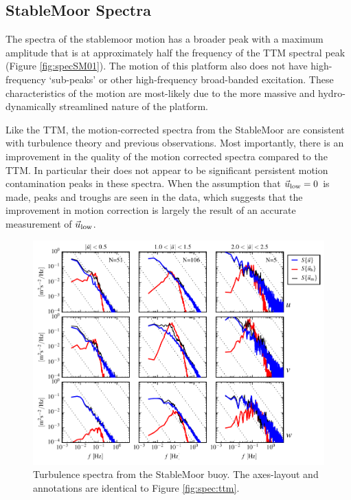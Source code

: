 \documentclass[twocol]{ametsoc}
\begin{document}
\subsection{StableMoor Spectra}

The spectra of the stablemoor motion has a broader peak with a maximum amplitude that is at approximately half the frequency of the TTM spectral peak (Figure \ref{fig:specSM01}). The motion of this platform also does not have high-frequency `sub-peaks' or other high-frequency broad-banded excitation. These characteristics of the motion are most-likely due to the more massive and hydro-dynamically streamlined nature of the platform. 

Like the TTM, the motion-corrected spectra from the StableMoor are consistent with turbulence theory and previous observations. Most importantly, there is an improvement in the quality of the motion corrected spectra compared to the TTM. In particular their does not appear to be significant persistent motion contamination peaks in these spectra. When the assumption that $\vec{u}_\mathrm{low}=0$ is made, peaks and troughs are seen in the data, which suggests that the improvement in motion correction is largely the result of an accurate measurement of $\vec{u}_\mathrm{low}$.

\begin{figure}[t]
  \centering
  \includegraphics{SpecFig02_SMnose}
  \caption{Turbulence spectra from the StableMoor buoy. The axes-layout and annotations are identical to Figure \ref{fig:spec:ttm}.}
  \label{fig:spec:sm}
\end{figure}
\end{document}
